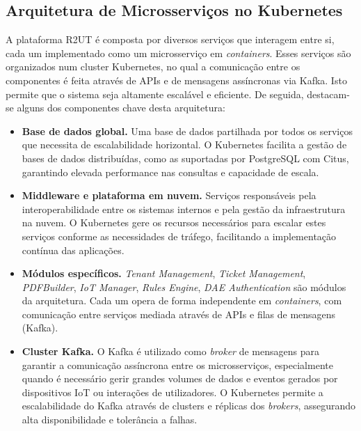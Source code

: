 \subsection{Arquitetura de Microsserviços no Kubernetes}


A plataforma R2UT é composta por diversos serviços que interagem entre si, cada um implementado como um microsserviço em \textit{containers}. Esses serviços são organizados num cluster Kubernetes, no qual a comunicação entre os componentes é feita através de APIs e de mensagens assíncronas via Kafka. Isto permite que o sistema seja altamente escalável e eficiente. De seguida, destacam-se alguns dos componentes chave desta arquitetura:

\begin{itemize}
    \item \textbf{Base de dados global.} Uma base de dados partilhada por todos os serviços que necessita de escalabilidade horizontal. O Kubernetes facilita a gestão de bases de dados distribuídas, como as suportadas por PostgreSQL com Citus, garantindo elevada performance nas consultas e capacidade de escala.

    \item \textbf{Middleware e plataforma em nuvem.} Serviços responsáveis pela interoperabilidade entre os sistemas internos e pela gestão da infraestrutura na nuvem. O Kubernetes gere os recursos necessários para escalar estes serviços conforme as necessidades de tráfego, facilitando a implementação contínua das aplicações.

    \item \textbf{Módulos específicos.} \textit{Tenant Management}, \textit{Ticket Management}, \textit{PDFBuilder}, \textit{IoT Manager}, \textit{Rules Engine}, \textit{DAE Authentication} são módulos da arquitetura. Cada um opera de forma independente em \textit{containers}, com comunicação entre serviços mediada através de APIs e filas de mensagens (Kafka).

    \item \textbf{Cluster Kafka.} O Kafka é utilizado como \textit{broker} de mensagens para garantir a comunicação assíncrona entre os microsserviços, especialmente quando é necessário gerir grandes volumes de dados e eventos gerados por dispositivos IoT ou interações de utilizadores. O Kubernetes permite a escalabilidade do Kafka através de clusters e réplicas dos \textit{brokers}, assegurando alta disponibilidade e tolerância a falhas.
\end{itemize}


